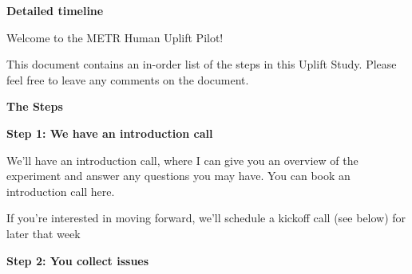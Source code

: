 \documentclass{article}
\begin{document}
\begin{instructionbox}
\textbf{Detailed timeline}

Welcome to the METR Human Uplift Pilot!

This document contains an in-order list of the steps in this Uplift Study. Please feel free to leave any comments on the document.

\textbf{The Steps}

\textbf{Step 1: We have an introduction call}

We’ll have an introduction call, where I can give you an overview of the experiment and answer any questions you may have. You can book an introduction call here.

If you’re interested in moving forward, we’ll schedule a kickoff call (see below) for later that week

\textbf{Step 2: You collect issues}


\end{instructionbox}
\end{document}
